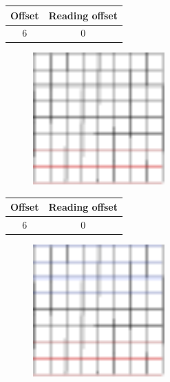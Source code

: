 \documentclass{beamer}
\begin{document}
\begin{frame}{}
    \begin{table}
        \centering
        \begin{tabular}{|c|c|}
            \hline
            Offset & Reading offset \\
            \hline
            6 & 0 \\
            \hline
        \end{tabular}
    \end{table}
    \begin{figure}
        \centering
        \includegraphics[width=0.45\textwidth]{grid_3r_3.pdf}
        \label{fig:grid_3r_3}
    \end{figure}
\end{frame}

\begin{frame}{}
    \begin{table}
        \centering
        \begin{tabular}{|c|c|}
            \hline
            Offset & Reading offset \\
            \hline
            6 & 0 \\
            \hline
        \end{tabular}
    \end{table}
    \begin{figure}
        \centering
        \includegraphics[width=0.45\textwidth]{grid_3r_3_ro_1.pdf}
        \label{fig:grid_3r_3_ro_1}
    \end{figure}
\end{frame}
\end{document}
